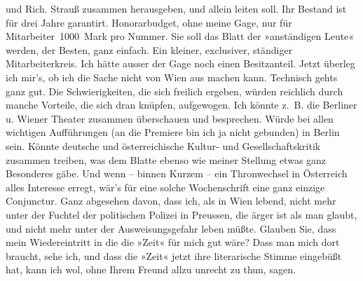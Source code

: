 \begin{ledgroupsized}[t]{13cm}
               und Rich. Strauß zusammen herausgeben, und
               allein leiten soll. Ihr Bestand ist für drei Jahre garantirt. Honorarbudget, ohne
               meine Gage, nur für Mitarbeiter 1000 Mark pro Nummer. Sie soll das Blatt der
               »anständigen Leute« werden, der Besten, ganz einfach. Ein kleiner, exclusiver,
               ständiger Mitarbeiterkreis. Ich hätte ausser der Gage noch einen Besitzanteil. Jetzt
               überleg ich mir’s, ob ich die Sache nicht von Wien
               aus machen kann. Technisch gehts ganz gut. Die Schwierigkeiten, die sich freilich
               ergeben, würden reichlich durch manche Vorteile, {\pb}die sich dran knüpfen,
               aufgewogen. Ich könnte z. B. die Berliner u. Wiener Theater zusammen überschauen und besprechen.
               Würde bei allen wichtigen Aufführungen (an die Premiere bin ich ja nicht gebunden) in
                  Berlin sein. Könnte deutsche und österreichische Kultur- und
               Gesellschaftskritik zusammen treiben, was dem Blatte ebenso wie meiner Stellung etwas ganz Besonderes gäbe. Und wenn – binnen Kurzem
               – ein Thronwechsel in Österreich alles
               Interesse erregt, wär’s für eine solche Wochenschrift eine ganz einzige Conjunctur.
               Ganz abgesehen davon, dass ich, als in Wien
               lebend, nicht mehr unter der Fuchtel der politischen Polizei in Preussen, die ärger ist als man glaubt, und nicht mehr unter
               der Ausweisungsgefahr leben müßte.\pend
           \pstart
           Glauben Sie, dass mein Wiedereintritt in die die »Zeit« für mich gut wäre? Dass man mich dort braucht, sehe ich, und dass die
                  »Zeit« jetzt ihre literarische Stimme
               eingebüßt hat, kann ich wol, ohne Ihrem Freund \label{K_L03430-4v}\label{K_L03430-4h} allzu unrecht zu thun, sagen.\pend

\end{ledgroupsized}
